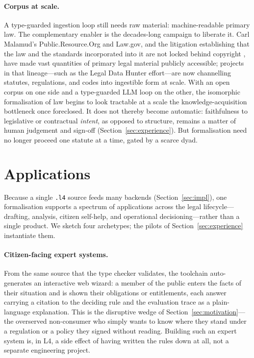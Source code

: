 \documentclass[sigconf,nonacm]{acmart}
\newcommand{\code}[1]{\texttt{\small #1}}
\begin{document}
\paragraph{Corpus at scale.}
A type-guarded ingestion loop still needs raw material: machine-readable
primary law. The complementary enabler is the decades-long campaign to
liberate it. Carl Malamud's Public.Resource.Org and Law.gov, and the
litigation establishing that the law and the standards incorporated into it
are not locked behind copyright \cite{publicresource}, have made vast
quantities of primary legal material publicly accessible; projects in that
lineage---such as the Legal Data Hunter effort---are now channelling
statutes, regulations, and codes into ingestible form at scale. With an open
corpus on one side and a type-guarded LLM loop on the other, the isomorphic
formalisation of law begins to look tractable at a scale the
knowledge-acquisition bottleneck once foreclosed. It does not thereby become
automatic: faithfulness to legislative or contractual \emph{intent}, as
opposed to structure, remains a matter of human judgement and sign-off
(Section~\ref{sec:experience}). But formalisation need no longer proceed one
statute at a time, gated by a scarce dyad.

\section{Applications}\label{sec:apps}
Because a single \code{.l4} source feeds many backends
(Section~\ref{sec:impl}), one formalisation supports a spectrum of
applications across the legal lifecycle---drafting, analysis, citizen
self-help, and operational decisioning---rather than a single product. We
sketch four archetypes; the pilots of Section~\ref{sec:experience}
instantiate them.

\paragraph{Citizen-facing expert systems.}
From the same source that the type checker validates, the toolchain
auto-generates an interactive web wizard: a member of the public enters the
facts of their situation and is shown their obligations or entitlements,
each answer carrying a citation to the deciding rule and the evaluation
trace as a plain-language explanation. This is the disruptive wedge of
Section~\ref{sec:motivation}---the overserved non-consumer who simply wants
to know where they stand under a regulation or a policy they signed without
reading. Building such an expert system is, in L4, a side effect of having
written the rules down at all, not a separate engineering project.
\end{document}
